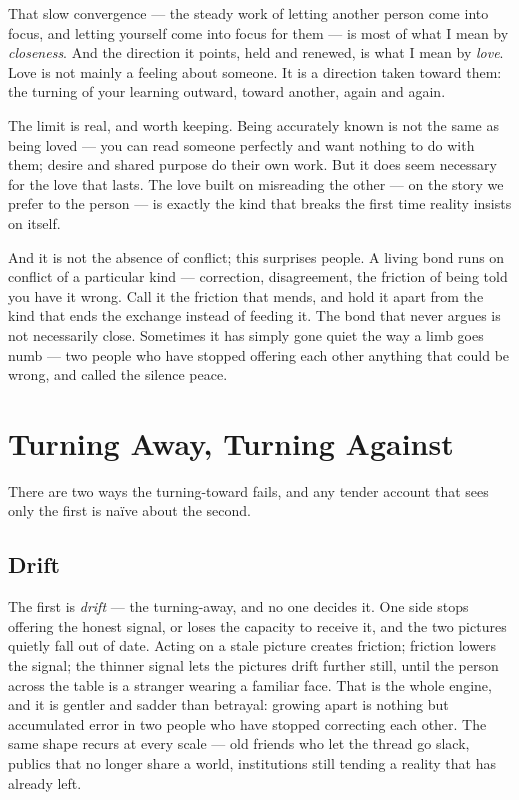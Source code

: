 \documentclass[12pt, a4paper]{article}
\begin{document}
That slow convergence — the steady work of letting another person come into focus, and letting yourself come into focus for them — is most of what I mean by \textit{closeness}. And the direction it points, held and renewed, is what I mean by \textit{love}. Love is not mainly a feeling about someone. It is a direction taken toward them: the turning of your learning outward, toward another, again and again.

The limit is real, and worth keeping. Being accurately known is not the same as being loved — you can read someone perfectly and want nothing to do with them; desire and shared purpose do their own work. But it does seem necessary for the love that lasts. The love built on misreading the other — on the story we prefer to the person — is exactly the kind that breaks the first time reality insists on itself.

And it is not the absence of conflict; this surprises people. A living bond runs on conflict of a particular kind — correction, disagreement, the friction of being told you have it wrong. Call it the friction that mends, and hold it apart from the kind that ends the exchange instead of feeding it. The bond that never argues is not necessarily close. Sometimes it has simply gone quiet the way a limb goes numb — two people who have stopped offering each other anything that could be wrong, and called the silence peace.

\section*{Turning Away, Turning Against}
There are two ways the turning-toward fails, and any tender account that sees only the first is naïve about the second.

\subsection*{Drift}
The first is \textit{drift} — the turning-away, and no one decides it. One side stops offering the honest signal, or loses the capacity to receive it, and the two pictures quietly fall out of date. Acting on a stale picture creates friction; friction lowers the signal; the thinner signal lets the pictures drift further still, until the person across the table is a stranger wearing a familiar face. That is the whole engine, and it is gentler and sadder than betrayal: growing apart is nothing but accumulated error in two people who have stopped correcting each other. The same shape recurs at every scale — old friends who let the thread go slack, publics that no longer share a world, institutions still tending a reality that has already left.
\end{document}
